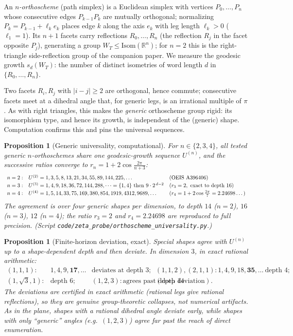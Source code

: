 \documentclass[11pt]{article}
\newcommand{\R}{\mathbb{R}}
\newtheorem{proposition}[theorem]{Proposition}
\theoremstyle{definition}
\begin{document}
An \emph{$n$-orthoscheme} (path simplex) is a Euclidean simplex with vertices
$P_0,\dots,P_n$ whose consecutive edges $P_{k-1}P_k$ are mutually orthogonal; normalizing
$P_k=P_{k-1}+\ell_k e_k$ places edge $k$ along the axis $e_k$ with leg length $\ell_k>0$
($\ell_1=1$). Its $n+1$ facets carry reflections $R_0,\dots,R_n$ (the reflection $R_j$ in the
facet opposite $P_j$), generating a group $W_T\le\mathrm{Isom}(\R^n)$; for $n=2$ this is the
right-triangle side-reflection group of the companion paper. We measure the geodesic growth
$s_d(W_T)$: the number of distinct isometries of word length $d$ in $\{R_0,\dots,R_n\}$.

Two facets $R_i,R_j$ with $|i-j|\ge2$ are orthogonal, hence commute; consecutive facets meet at a
dihedral angle that, for generic legs, is an irrational multiple of $\pi$. As with right
triangles, this makes the \emph{generic} orthoscheme group rigid: its isomorphism type, and hence
its growth, is independent of the (generic) shape. Computation confirms this and pins the
universal sequences.

\begin{proposition}[Generic universality, computational]
\label{prop:generic}
For $n\in\{2,3,4\}$, all tested generic $n$-orthoschemes share one geodesic-growth sequence
$U^{(n)}$, and the successive ratios converge to $r_n=1+2\cos\frac{2\pi}{n+3}$:
\[
\begin{array}{lll}
n=2: & U^{(2)}=1,3,5,8,13,21,34,55,89,144,225,\dots & (\textup{OEIS A396406})\\[2pt]
n=3: & U^{(3)}=1,4,9,18,36,72,144,288,\dots = \{1,4\}\ \text{then}\ 9\cdot2^{\,d-2} & (r_3=2,\ \text{exact to depth }16)\\[2pt]
n=4: & U^{(4)}=1,5,14,33,75,169,380,854,1919,4312,9689,\dots & (r_4=1+2\cos\tfrac{2\pi}7=2.24698\dots)
\end{array}
\]
The agreement is over four generic shapes per dimension, to depth $14$ ($n=2$), $16$ ($n=3$),
$12$ ($n=4$); the ratio $r_3=2$ and $r_4=2.24698$ are reproduced to full precision. (Script
\texttt{code/zeta\_probe/orthoscheme\_universality.py}.)
\end{proposition}

\begin{proposition}[Finite-horizon deviation, exact]
\label{prop:deviation}
Special shapes agree with $U^{(n)}$ up to a shape-dependent depth and then deviate. In dimension
$3$, in \emph{exact rational arithmetic}:
\[
\begin{array}{llll}
(1,1,1): & 1,4,9,\mathbf{17},\dots & \text{deviates at depth }3; &
(1,1,2),(2,1,1): 1,4,9,18,\mathbf{35},\dots\ \text{depth }4;\\
(1,\sqrt3,1): & \text{depth }6; & (1,2,3): \text{agrees past depth }14 & (\text{deep deviation}).
\end{array}
\]
The deviations are certified in exact arithmetic (rational legs give rational reflections), so they
are genuine group-theoretic collapses, not numerical artifacts. As in the plane, shapes with a
rational dihedral angle deviate early, while shapes with only ``generic'' angles (e.g.\ $(1,2,3)$)
agree far past the reach of direct enumeration.
\end{proposition}
\end{document}

